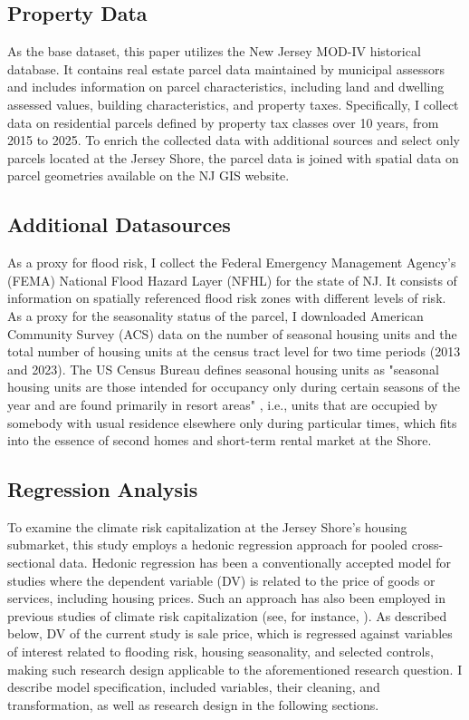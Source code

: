 \documentclass[11pt]{article}
\begin{document}
    \subsection{Property Data}

    As the base dataset, this paper utilizes the New Jersey MOD-IV historical database. It contains real estate parcel data maintained by municipal assessors and includes information on parcel characteristics, including land and dwelling assessed values, building characteristics, and property taxes. Specifically, I collect data on residential parcels defined by property tax classes over 10 years, from 2015 to 2025. To enrich the collected data with additional sources and select only parcels located at the Jersey Shore, the parcel data is joined with spatial data on parcel geometries available on the NJ GIS website. 

    \subsection{Additional Datasources}

    As a proxy for flood risk, I collect the Federal Emergency Management Agency's (FEMA) National Flood Hazard Layer (NFHL) for the state of NJ. It consists of information on spatially referenced flood risk zones with different levels of risk. As a proxy for the seasonality status of the parcel, I downloaded American Community Survey (ACS) data on the number of seasonal housing units and the total number of housing units at the census tract level for two time periods (2013 and 2023). The US Census Bureau defines seasonal housing units as "seasonal housing units are those intended for occupancy only during certain seasons of the year and are found primarily in resort areas" \parencite{uscensusbureau-DEFINITIONSEXPLANATIONS}, i.e., units that are occupied by somebody with usual residence elsewhere only during particular times, which fits into the essence of second homes and short-term rental market at the Shore. 

    \subsection{Regression Analysis}

    To examine the climate risk capitalization at the Jersey Shore's housing submarket, this study employs a hedonic regression approach for pooled cross-sectional data. Hedonic regression has been a conventionally accepted model for studies where the dependent variable (DV) is related to the price of goods or services, including housing prices. Such an approach has also been employed in previous studies of climate risk capitalization (see, for instance, \cite{putra2017-RealPropertyMarket}). As described below, DV of the current study is sale price, which is regressed against variables of interest related to flooding risk, housing seasonality, and selected controls, making such research design applicable to the aforementioned research question. I describe model specification, included variables, their cleaning, and transformation, as well as research design in the following sections. 
\end{document}
